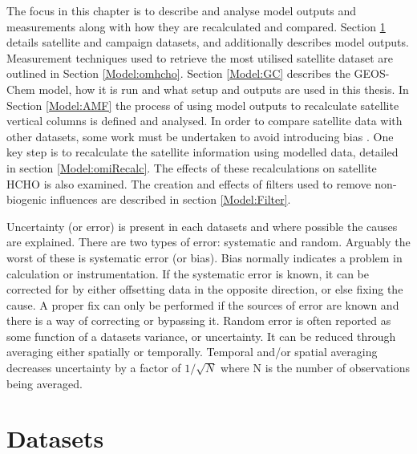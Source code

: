   The focus in this chapter is to describe and analyse model outputs and measurements along with how they are recalculated and compared.
  Section \ref{Model:Datasets} details satellite and campaign datasets, and additionally describes model outputs.
  Measurement techniques used to retrieve the most utilised satellite dataset are outlined in Section \ref{Model:omhcho}.
  Section \ref{Model:GC} describes the GEOS-Chem model, how it is run and what setup and outputs are used in this thesis.
  In Section \ref{Model:AMF} the process of using model outputs to recalculate satellite vertical columns is defined and analysed.
  In order to compare satellite data with other datasets, some work must be undertaken to avoid introducing bias \parencite[eg.][]{Palmer2001, Eskes2003, Marais2012, Lamsal2014}.
  One key step is to recalculate the satellite information using modelled data, detailed in section \ref{Model:omiRecalc}.
  The effects of these recalculations on satellite HCHO is also examined.
  The creation and effects of filters used to remove non-biogenic influences are described in section \ref{Model:Filter}.
  
  Uncertainty (or error) is present in each datasets and where possible the causes are explained.
  There are two types of error: systematic and random.
  Arguably the worst of these is systematic error (or bias).
  Bias normally indicates a problem in calculation or instrumentation.
  If the systematic error is known, it can be corrected for by either offsetting data in the opposite direction, or else fixing the cause.
  A proper fix can only be performed if the sources of error are known and there is a way of correcting or bypassing it.
  Random error is often reported as some function of a datasets variance, or uncertainty.
  It can be reduced through averaging either spatially or temporally. 
  Temporal and/or spatial averaging decreases uncertainty by a factor of $1/\sqrt{N}$ where N is the number of observations being averaged.
  
  

\section{Datasets}
  \label{Model:Datasets}
  
